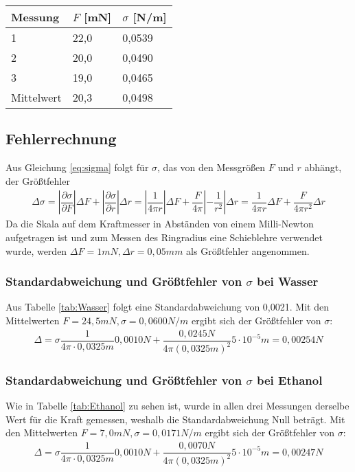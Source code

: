 \documentclass{scrartcl}
\begin{document}
\begin{table}[H]
\begin{center}
\begin{tabular}{l|l|l}
Messung    & $F$ {[}mN{]} & $\sigma$ {[}N/m{]} \\
\hline
1          & 22,0       & 0,0539    \\
2          & 20,0       & 0,0490    \\
3          & 19,0       & 0,0465    \\
Mittelwert & 20,3       & 0,0498                    
\end{tabular}
\end{center}
\label{tab:Kochsalz}
\end{table}
\subsection{Fehlerrechnung}
Aus Gleichung \ref{eq:sigma} folgt für $\sigma$, das von den Messgrößen $F$ und $r$ abhängt, der Größtfehler
\begin{align*}
\Delta \sigma = \left| \dfrac{\partial \sigma}{\partial F} \right| \Delta F + \left| \dfrac{\partial \sigma}{\partial r} \right| \Delta r = \left| \dfrac{1}{4 \pi r} \right| \Delta F + \dfrac{F}{4 \pi} \left| - \dfrac{1}{r^2} \right| \Delta r =\dfrac{1}{4 \pi r} \Delta F + \dfrac{F}{4 \pi r^2} \Delta r
\end{align*}
Da die Skala auf dem Kraftmesser in Abständen von einem Milli-Newton aufgetragen ist und zum Messen des Ringradius eine Schieblehre verwendet wurde, werden $\Delta F = 1mN, \Delta r = 0,05mm$ als Größtfehler angenommen.

\subsubsection{Standardabweichung und Größtfehler von $\sigma$ bei Wasser}
Aus Tabelle \ref{tab:Wasser} folgt eine Standardabweichung von 0,0021. Mit den Mittelwerten $F = 24,5mN, \sigma = 0,0600N/m$ ergibt sich der Größtfehler von $\sigma$:
\begin{align*}
\Delta = \sigma \dfrac{1}{4 \pi \cdot 0,0325m} 0,0010N + \dfrac{0,0245N}{4 \pi (0,0325m)^2} 5 \cdot 10^{-5}m = 0,00254N
\end{align*}
\subsubsection{Standardabweichung und Größtfehler von $\sigma$ bei Ethanol}
Wie in Tabelle \ref{tab:Ethanol} zu sehen ist, wurde in allen drei Messungen derselbe Wert für die Kraft gemessen, weshalb die Standardabweichung Null beträgt. Mit den Mittelwerten $F = 7,0mN, \sigma = 0,0171N/m$ ergibt sich der Größtfehler von $\sigma$:
\begin{align*}
\Delta = \sigma \dfrac{1}{4 \pi \cdot 0,0325m} 0,0010N + \dfrac{0,0070N}{4 \pi (0,0325m)^2} 5 \cdot 10^{-5}m = 0,00247N
\end{align*}
\end{document}
